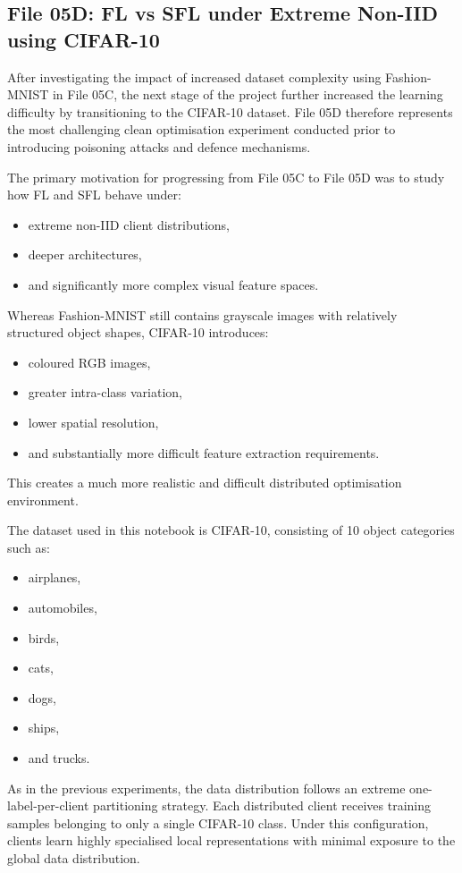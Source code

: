 \subsection*{File 05D: FL vs SFL under Extreme Non-IID using CIFAR-10}

After investigating the impact of increased dataset complexity using Fashion-MNIST in File 05C, the next stage of the project further increased the learning difficulty by transitioning to the CIFAR-10 dataset. File 05D therefore represents the most challenging clean optimisation experiment conducted prior to introducing poisoning attacks and defence mechanisms.

The primary motivation for progressing from File 05C to File 05D was to study how FL and SFL behave under:
\begin{itemize}
    \item extreme non-IID client distributions,
    \item deeper architectures,
    \item and significantly more complex visual feature spaces.
\end{itemize}

Whereas Fashion-MNIST still contains grayscale images with relatively structured object shapes, CIFAR-10 introduces:
\begin{itemize}
    \item coloured RGB images,
    \item greater intra-class variation,
    \item lower spatial resolution,
    \item and substantially more difficult feature extraction requirements.
\end{itemize}

This creates a much more realistic and difficult distributed optimisation environment.

The dataset used in this notebook is CIFAR-10, consisting of 10 object categories such as:
\begin{itemize}
    \item airplanes,
    \item automobiles,
    \item birds,
    \item cats,
    \item dogs,
    \item ships,
    \item and trucks.
\end{itemize}

As in the previous experiments, the data distribution follows an extreme one-label-per-client partitioning strategy. Each distributed client receives training samples belonging to only a single CIFAR-10 class. Under this configuration, clients learn highly specialised local representations with minimal exposure to the global data distribution.

